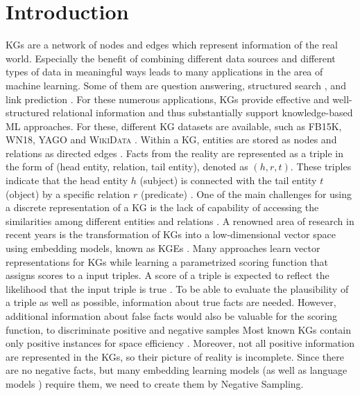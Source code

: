 \chapter{Introduction}
\label{ch:introduction}

\acp{KG} are a network of nodes and edges which represent information of the real world. 
Especially the benefit of combining different data sources and different types of data in meaningful ways leads to many applications in the area of machine learning.
Some of them are question answering, structured search \cite{zhang2019nscaching}, and link prediction \cite{cai2017kbgan, Alam2020AffinityDN}.
For these numerous applications, \acp{KG} provide effective and well-structured relational information and thus substantially support knowledge-based ML approaches.
For these, different \ac{KG} datasets are available, such as \textsc{FB15K}, \textsc{WN18}, \textsc{YAGO} \cite{ConEx} and \textsc{WikiData} \cite{arnaoutwikinegata}.
Within a \ac{KG}, entities are stored as nodes and relations as directed edges \cite{zhang2019nscaching}.
Facts from the reality are represented as a triple in the form of (head entity, relation, tail entity), denoted as $(h, r, t)$.
These triples indicate that the head entity $h$ (subject) is connected with the tail entity $t$ (object) by a specific relation $r$ (predicate) \cite{zhang2019nscaching, Alam2020AffinityDN}.
One of the main challenges for using a discrete representation of a \ac{KG} is the lack of capability of accessing the similarities among different entities and relations \cite{cai2017kbgan}. 
A renowned area of research in recent years is the transformation of \acp{KG} into a low-dimensional vector space using embedding models, known as \acp{KGE} \cite{Alam2020AffinityDN}.
Many approaches learn vector representations for \acp{KG} while learning a parametrized scoring function that assigns scores to a input triples.
A score of a triple is expected to reflect the likelihood that the input triple is true \cite{ConvE, qiannegative}.
To be able to evaluate the plausibility of a triple as well as possible, information about true facts are needed.
However, additional information about false facts would also be valuable for the scoring function, to discriminate positive and negative samples \cite{qiannegative}
Most known \acp{KG} contain only positive instances
for space efficiency \cite{qiannegative}.
Moreover, not all positive information are represented in the \acp{KG}, so their picture of reality is incomplete.
Since there are no negative facts, but many embedding learning models (as well as language models \cite{MikolovSCCD13}) require them, we need to create them by Negative Sampling.

